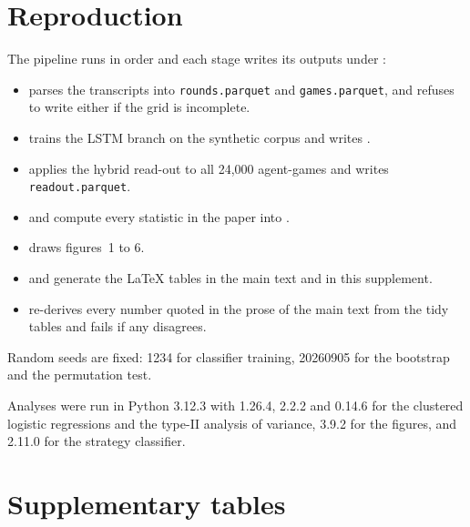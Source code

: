 \documentclass[11pt,a4paper]{article}
\begin{document}
\section{Reproduction}

The pipeline runs in order and each stage writes its outputs under
:

\begin{itemize}
\item {} parses the transcripts into \texttt{rounds.parquet}
      and \texttt{games.parquet}, and refuses to write either if the grid is
      incomplete.
\item {} trains the LSTM branch on the synthetic
      corpus and writes .
\item {} applies the hybrid read-out to all 24{,}000
      agent-games and writes \texttt{readout.parquet}.
\item {} and  compute every
      statistic in the paper into .
\item {} draws figures~1 to 6.
\item {} and  generate the
      LaTeX tables in the main text and in this supplement.
\item {} re-derives every number quoted in the prose of
      the main text from the tidy tables and fails if any disagrees.
\end{itemize}

Random seeds are fixed: 1234 for classifier training, 20260905 for the
bootstrap and the permutation test.

Analyses were run in Python 3.12.3 with  1.26.4,  2.2.2
and  0.14.6 for the clustered logistic regressions and the
type-II analysis of variance,  3.9.2 for the figures, and
 2.11.0 for the strategy classifier.

\section{Supplementary tables}


\end{document}
